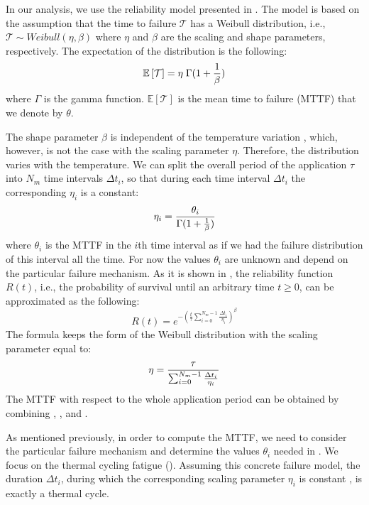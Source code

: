 In our analysis, we use the reliability model presented in \cite{huang2009,
xiang2010}. The model is based on the assumption that the time to failure
$\mathcal{T}$ has a Weibull distribution, i.e., $\mathcal{T} \sim Weibull(\eta,
\beta)$ where $\eta$ and $\beta$ are the scaling and shape parameters,
respectively. The expectation of the distribution is the following:
\begin{equation} \elab{general-mttf}
  \mathbb{E}\left[\mathcal{T}\right] = \eta \; \Gamma(1 + \frac{1}{\beta})
\end{equation}
where $\Gamma$ is the gamma function. $\mathbb{E}\left[\mathcal{T}\right]$ is
the mean time to failure (MTTF) that we denote by $\theta$.

The shape parameter $\beta$ is independent of the temperature variation
\cite{chang2006}, which, however, is not the case with the scaling parameter
$\eta$. Therefore, the distribution varies with the temperature. We can split
the overall period of the application $\tau$ into $N_m$ time intervals $\Delta
t_i$, so that during each time interval $\Delta t_i$ the corresponding $\eta_i$
is a constant:
\begin{equation} \elab{eta-one}
  \eta_i = \frac{\theta_i}{\Gamma(1 + \frac{1}{\beta})}
\end{equation}
where $\theta_i$ is the MTTF in the $i$th time interval as if we had the failure
distribution of this interval all the time. For now the values $\theta_i$ are
unknown and depend on the particular failure mechanism. As it is shown in
\cite{xiang2010}, the reliability function $R(t)$, i.e., the probability of
survival until an arbitrary time $t \geq 0$, can be approximated as the
following:
\[
  R(t) = e^{-(\frac{t}{\tau} \sum_{i=0}^{N_m - 1} \frac{\Delta t_i}{\eta_i})^\beta}
\]
The formula keeps the form of the Weibull distribution with the scaling
parameter equal to:
\begin{equation} \elab{eta-many}
  \eta = \frac{\tau}{\sum_{i=0}^{N_m - 1} \frac{\Delta t_i}{\eta_i}}
\end{equation}
The MTTF with respect to the whole application period can be obtained by
combining , , and .

As mentioned previously, in order to compute the MTTF, we need to consider the
particular failure mechanism and determine the values $\theta_i$ needed in
. We focus on the thermal cycling fatigue
(). Assuming this concrete failure model, the duration
$\Delta t_i$, during which the corresponding scaling parameter $\eta_i$ is
constant , is exactly a thermal cycle.

